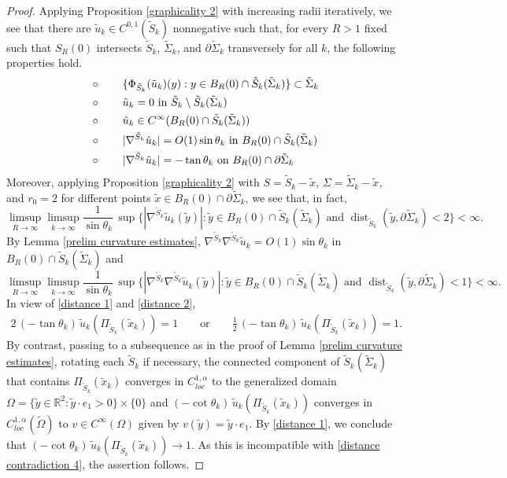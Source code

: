 \documentclass[11pt]{amsart}
\begin{document}
\begin{proof}
Applying Proposition \ref{graphicality 2} with increasing radii iteratively, we see that there are  $\tilde u_k\in C^{0,1}(\tilde S_k)$ nonnegative such that, for every  $R>1$ fixed such that $S_R(0)$ intersects $\tilde S_k$, $\tilde \Sigma_k$, and $\partial \tilde \Sigma_k$  transversely for all $k$, the following properties hold.
\begin{equation*} 
\begin{aligned}
		&\circ\qquad \{\Phi_{\tilde S_k}(\tilde u_k)(y):y\in  B_R(0)\cap {\tilde S}_k(\tilde \Sigma_k)\}\subset \tilde \Sigma_k\\ 
		&\circ\qquad \text{$\tilde u_k=0$ in $\tilde S_k\setminus \tilde S_k(\tilde \Sigma_k)$} \\ 
		&\circ\qquad \text{$ \tilde u_k\in C^\infty(B_R(0)\cap  \tilde S_k(\tilde\Sigma_k))$}\\ 
		&\circ\qquad \text{$|\nabla^{\tilde S_k} \tilde u_k|=O(1) \sin\theta_k$ in $ B_R(0)\cap\tilde S_k(\tilde\Sigma_k)$}\\ 
		&\circ\qquad \text{$|\nabla^{\tilde S_k} \tilde u_k|=-\tan\theta_k$ on $B_R(0)\cap \partial \tilde \Sigma_k $}
\end{aligned}
\end{equation*}
Moreover, applying Proposition \ref{graphicality 2} with $S=\tilde S_k-\tilde x$, $\Sigma=\tilde \Sigma_k-\tilde x$, and $r_0=2$ for different points $\tilde x\in B_R(0)\cap  \partial \tilde  \Sigma_k$, we see that, in fact, 
$$
\limsup_{R\to\infty} \limsup_{k\to\infty}\frac1{\sin\theta_k}\,\sup\{|\nabla^{\tilde S_k}\tilde u_k(\tilde y)|:\text{$\tilde y\in B_R(0)\cap \tilde S_k(\tilde \Sigma_k)$ and $\operatorname{dist}_{\tilde S_k}(\tilde y, \partial \tilde \Sigma_k)<2$} \}<\infty. 
$$
By Lemma \ref{prelim curvature estimates},
$
\text{$\nabla^{\tilde S_k}\nabla^{\tilde S_k} \tilde u_k=O(1)\sin\theta_k$}
$
in $B_R(0)\cap \tilde S_k(\tilde \Sigma_k)$ and 
$$
\limsup_{R\to\infty} \limsup_{k\to\infty}\frac1{\sin\theta_k}\,\sup\{|\nabla^{\tilde S_k}\nabla^{\tilde S_k}\tilde u_k(\tilde y)|:\text{$\tilde y\in B_R(0)\cap \tilde S_k(\tilde \Sigma_k)$ and $\operatorname{dist}_{\tilde S_k}(\tilde y, \partial \tilde \Sigma_k)<1$} \}<\infty. 
$$
In view of \eqref{distance 1} and \eqref{distance 2}, 
\begin{align} \label{distance contradiction 4} 
	2\,(-\tan\theta_k)\,\tilde u_k(\Pi_{\tilde S_k}(\tilde x_k))=1\qquad\text{or}\qquad \frac12\,(-\tan\theta_k)\,\tilde u_k(\Pi_{\tilde S_k}(\tilde x_k))=1.
\end{align} 
By contrast, passing to a subsequence as in the proof of Lemma \ref{prelim curvature estimates}, rotating each $\tilde S_k$ if necessary, the connected component of $\tilde S_k(\tilde \Sigma_k)$ that contains $\Pi_{\tilde S_k}(\tilde x_k)$ converges  in $C_{loc}^{1,\alpha}$ to the generalized domain $\Omega=\{\tilde y\in \mathbb{R}^2:\tilde y\cdot e_1>0\}\times \{0\}$ and $(-\cot\theta_k)\,\tilde u_k(\Pi_{\tilde S_k}(\tilde x_k))$ converges  in $C_{loc}^{1,\alpha}(\tilde \Omega)$ to $v\in C^\infty(\Omega)$ given by $v(\tilde y)=\tilde y\cdot e_1$. By \eqref{distance 1}, we conclude that $(-\cot\theta_k)\,\tilde u_k(\Pi_{\tilde S_k}(\tilde x_k))\to 1$. As this is incompatible with  \eqref{distance contradiction 4}, the assertion follows.

\end{proof}
\end{document}
